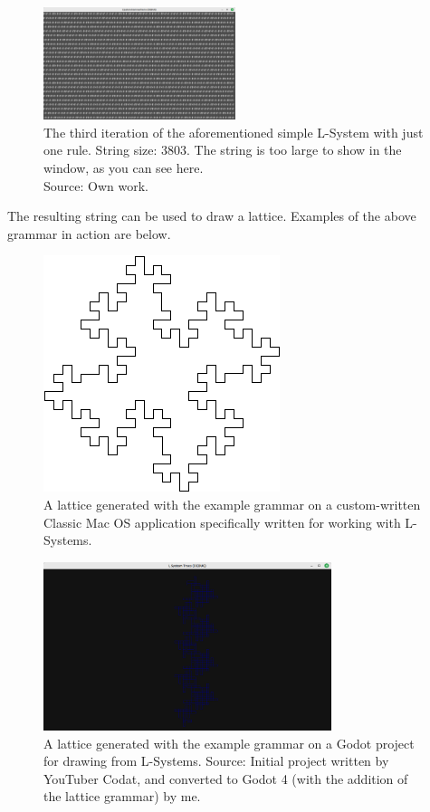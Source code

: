 \begin{figure}[H]
	\centering
	\includegraphics[width=0.5\textwidth]{Images/initial-l-system-iteration-3.png}
	\caption{The third iteration of the aforementioned simple L-System with just one rule. String size: 3803. The string is too large to show in the window, as you can see here.\\Source: Own work.}
	\label{fig:lsysiter3}
\end{figure}

The resulting string can be used to draw a lattice.\cite{lsyspaulbourke} Examples of the above grammar in action are below.

\begin{figure}[H]
    \centering
    \includegraphics[height=0.25\textheight]{Images/lsys03.png}
    \caption{A lattice generated with the example grammar on a custom-written Classic Mac OS application specifically written for working with L-Systems.\cite{lsyspaulbourke}}
    \label{fig:lattice1}
\end{figure}

\begin{figure}[H]
    \centering
    \includegraphics[width=0.75\textwidth]{Images/gd4lattice.png}
    \caption{A lattice generated with the example grammar on a Godot project for drawing from L-Systems. Source: Initial project written by YouTuber Codat\cite{codatGD3LSystemYT}\cite{codatGD3LSystemGH}, and converted to Godot 4 (with the addition of the lattice grammar) by me.\cite{codatGD4LSystemGH}}
    \label{fig:lattice2}
\end{figure}

